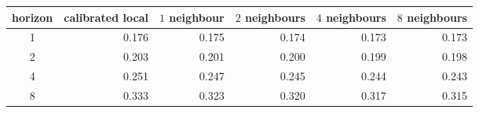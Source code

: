 \begin{tabular}{@{}crrrrr@{}}
\toprule
horizon & calibrated local & $1$ neighbour & $2$ neighbours & $4$ neighbours & $8$ neighbours \\
\midrule
1 & 0.176 & 0.175 & 0.174 & 0.173 & 0.173 \\
2 & 0.203 & 0.201 & 0.200 & 0.199 & 0.198 \\
4 & 0.251 & 0.247 & 0.245 & 0.244 & 0.243 \\
8 & 0.333 & 0.323 & 0.320 & 0.317 & 0.315 \\
\bottomrule
\end{tabular}
